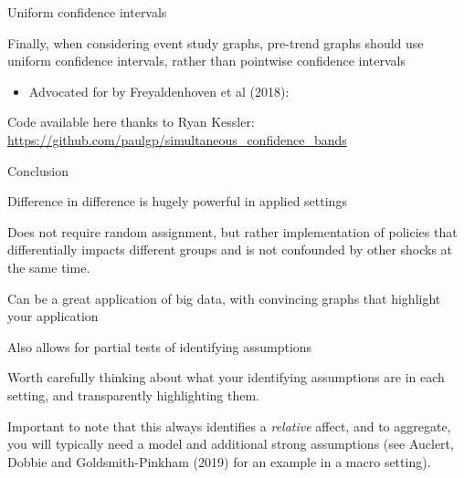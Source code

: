 \documentclass[notes,11pt, aspectratio=169]{beamer}
\newenvironment{wideitemize}{\itemize\addtolength{\itemsep}{10pt}}{\enditemize}
\begin{document}
\begin{frame}{Uniform confidence intervals}
  \begin{wideitemize}
  \item Finally, when considering event study graphs, pre-trend graphs
    should use uniform confidence intervals, rather than pointwise confidence intervals
    \begin{itemize}
    \item Advocated for by Freyaldenhoven et al (2018):
    \end{itemize}
  \item Code available here thanks to Ryan Kessler: \url{https://github.com/paulgp/simultaneous_confidence_bands}
    \begin{center}
    \end{center}
  \end{wideitemize}
\end{frame}


\begin{frame}{Conclusion}
  \begin{wideitemize}
  \item Difference in difference is hugely powerful in applied settings
  \item Does not require random assignment, but rather implementation
    of policies that differentially impacts different groups and is
    not confounded by other shocks at the same time.
  \item Can be a great application of big data, with convincing graphs
    that highlight your application
  \item Also allows for partial tests of identifying assumptions
  \item Worth carefully thinking about what your identifying
    assumptions are in each setting, and transparently highlighting
    them.
  \item Important to note that this always identifies a
    \emph{relative} affect, and to aggregate, you will typically need
    a model and additional strong assumptions (see Auclert, Dobbie and
    Goldsmith-Pinkham (2019) for an example in a macro setting).
  \end{wideitemize}
\end{frame}
\end{document}
